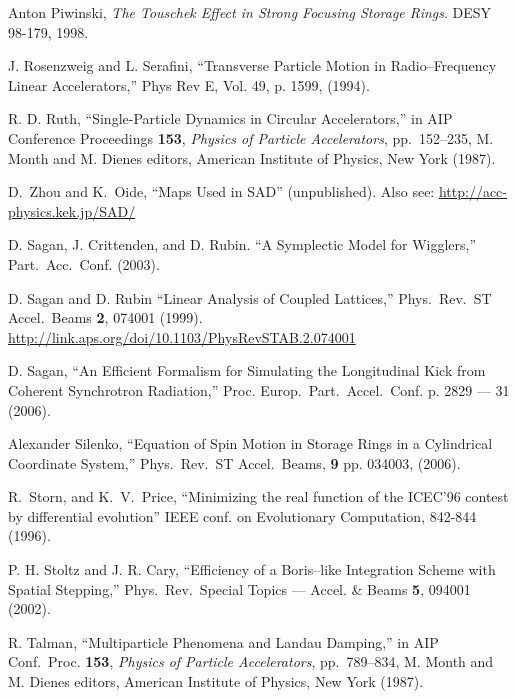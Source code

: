 \begin{thebibliography}{XXXXXXX99}
Anton Piwinski, \emph{The Touschek Effect in Strong Focusing Storage Rings}.
DESY 98-179, 1998.

J. Rosenzweig and L. Serafini, ``Transverse Particle Motion in
Radio--Frequency Linear Accelerators,'' Phys Rev E, Vol. 49, p. 1599,
(1994).

 R. D. Ruth, ``Single-Particle Dynamics in
Circular Accelerators,'' in AIP Conference Proceedings {\bf 153}, {\em
Physics of Particle Accelerators}, pp.~152--235, M. Month and M. Dienes editors,
American Institute of Physics, New York (1987).

D.~Zhou and K.~Oide, ``Maps Used in SAD'' (unpublished).
Also see:
\hfill\break
\hspace*{0.3in} \url{http://acc-physics.kek.jp/SAD/}

D. Sagan, J. Crittenden, and D. Rubin.
``A Symplectic Model for Wigglers,'' Part.\ Acc.\ Conf. (2003).

D. Sagan and D. Rubin ``Linear Analysis of Coupled Lattices,''
Phys.\ Rev.\ ST Accel.\ Beams {\bf 2}, 074001 (1999).
\hfill\break
\hspace*{20pt} 
\url{http://link.aps.org/doi/10.1103/PhysRevSTAB.2.074001}

D. Sagan, ``An Efficient Formalism for Simulating the Longitudinal Kick from Coherent 
Synchrotron Radiation,'' Proc. Europ.\ Part.\ Accel.\ Conf. p. 2829 --- 31 (2006).

Alexander Silenko, ``Equation of Spin Motion in Storage Rings in a Cylindrical Coordinate System,''
Phys.\ Rev.\ ST Accel.\ Beams, {\bf 9} pp. 034003, (2006).


R.~Storn, and K.~V.~Price, ``Minimizing the real function of the
ICEC'96 contest by differential evolution'' IEEE conf. on Evolutionary
Computation, 842-844 (1996).

P. H. Stoltz and J. R. Cary, ``Efficiency of a Boris--like Integration
Scheme with Spatial Stepping,'' Phys.\ Rev.\ Special Topics ---
Accel. \& Beams {\bf 5}, 094001 (2002).

 R. Talman, ``Multiparticle Phenomena and
Landau Damping,'' in AIP Conf.\ Proc.  {\bf 153}, {\em Physics of
Particle Accelerators}, pp.~789--834, M. Month and M. Dienes editors,
American Institute of Physics, New York (1987).


\end{thebibliography}
